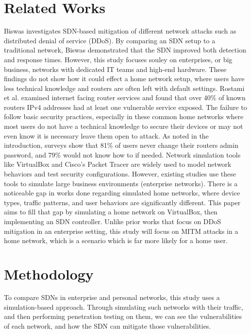 \documentclass[12pt]{article}
\begin{document}
\section{Related Works}
Biswas \cite{biswas2021mitigation} investigates SDN-based mitigation of different network attacks such as 
distributed denial of service (DDoS). By comparing an SDN setup to a traditional network, Biswas demonstrated 
that the SDN improved both detection and response times. However, this study focuses souley on enterprises, 
or big business, networks with dedicated IT teams and high-end hardware. These findings do not show how it 
could effect a home network setup, where users have less technical knowledge and routers are often left 
with default settings.
Rostami et al. \cite{InternetFacingRouterRostami} examined internet facing router services and found that 
over 40\% of known routers IPv4 
addresses had at least one vulnerable service exposed. The failure to follow basic security practices, 
especially in these common home networks where most users do not have a technical knowledge to secure their 
devices or may not even know it is necessary leave them open to attack. As noted in the introduction, 
surveys show that 81\% of users never change their routers admin password, and 79\% would not know how to 
if needed.
Network simulation tools like VirtualBox \cite{virtualbox_docs} and Cisco's Packet Tracer 
\cite{cisco_packet_tracer_install} are widely used to model 
network behaviors and test security configurations. However, existing studies use these tools to simulate 
large business environments (enterprise networks). There is a noticeable gap in works done regarding 
simulated home networks, where device types, traffic patterns, and user behaviors are significantly 
different. This paper aims to fill that gap by simulating a home network on VirtualBox, then implementing 
an SDN controller. Unlike prior works that focus on DDoS mitigation in an enterprise setting, this study 
will focus on MITM attacks in a home network, which is a scenario which is far more likely for a home user. 

\section{Methodology}
To compare SDNs in enterprise and personal networks, this study uses a simulation-based approach. Through 
simulating such networks with their traffic, and then performing penetration testing on them, we can see 
the vulnerabilities of each network, and how the SDN can mitigate those vulnerabilities.
\end{document}
